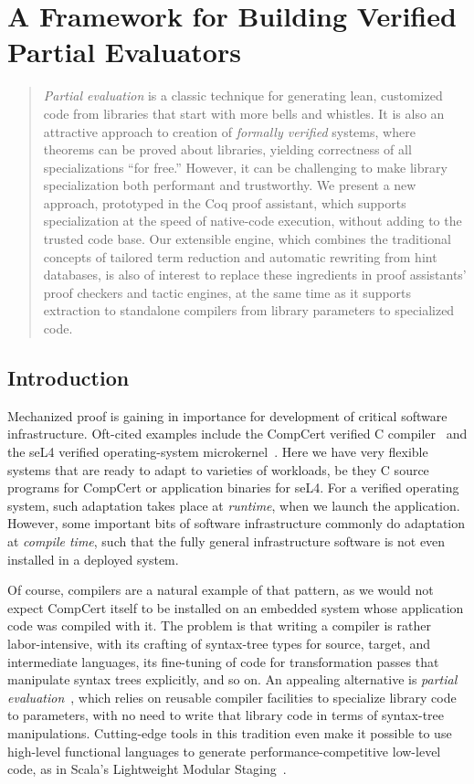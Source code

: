 \chapter{A Framework for Building Verified Partial Evaluators} \label{ch:rewriting}
\begin{abstract}
  \emph{Partial evaluation} is a classic technique for generating lean, customized code from libraries that start with more bells and whistles.
  It is also an attractive approach to creation of \emph{formally verified} systems, where theorems can be proved about libraries, yielding correctness of all specializations ``for free.''
  However, it can be challenging to make library specialization both performant and trustworthy.
  We present a new approach, prototyped in the Coq proof assistant, which supports specialization at the speed of native-code execution, without adding to the trusted code base.
  Our extensible engine, which combines the traditional concepts of tailored term reduction and automatic rewriting from hint databases, is also of interest to replace these ingredients in proof assistants' proof checkers and tactic engines, at the same time as it supports extraction to standalone compilers from library parameters to specialized code.
\end{abstract}

\section{Introduction} \label{sec:rewriting:intro}

Mechanized proof is gaining in importance for development of critical software infrastructure.
Oft-cited examples include the CompCert verified C compiler~\cite{Compcert} and the seL4 verified operating-system microkernel~\cite{seL4SOSP09}.
Here we have very flexible systems that are ready to adapt to varieties of workloads, be they C source programs for CompCert or application binaries for seL4.
For a verified operating system, such adaptation takes place at \emph{runtime}, when we launch the application.
However, some important bits of software infrastructure commonly do adaptation at \emph{compile time}, such that the fully general infrastructure software is not even installed in a deployed system.

Of course, compilers are a natural example of that pattern, as we would not expect CompCert itself to be installed on an embedded system whose application code was compiled with it.
The problem is that writing a compiler is rather labor-intensive, with its crafting of syntax-tree types for source, target, and intermediate languages, its fine-tuning of code for transformation passes that manipulate syntax trees explicitly, and so on.
An appealing alternative is \emph{partial evaluation}~\cite{PartialEvaluation}, which relies on reusable compiler facilities to specialize library code to parameters, with no need to write that library code in terms of syntax-tree manipulations.
Cutting-edge tools in this tradition even make it possible to use high-level functional languages to generate performance-competitive low-level code, as in Scala's Lightweight Modular Staging~\cite{LMS}.

